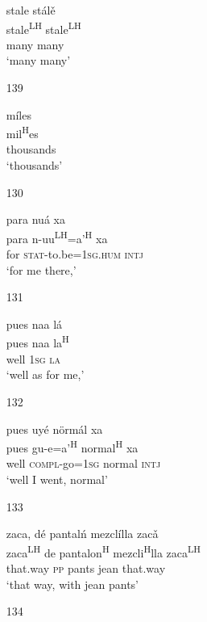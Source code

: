 \begin{itemize}
\glll   stale st\'{a}l\v{e}\\
stale\textsuperscript{LH} stale\textsuperscript{LH}\\
 many many\\
\glt `many many'
 



\item[139]
 
\glll   m\'{i}les\\
mil\textsuperscript{H}es\\
thousands\\
\glt `thousands'
 

\item[130]
 
\glll   para nu\'{a} xa \\
para n-uu\textsuperscript{LH}=a'\textsuperscript{H} xa \\
for \textsc{stat}-to.be=\textsc{1sg.hum} \textsc{intj}\\
\glt `for me there,'
 


\item[131]
 
\glll   pues naa l\'{a} \\
pues naa la\textsuperscript{H}\\
well \textsc{1sg} \textsc{la}\\
\glt `well as for me,'
 


\item[132]
 
\glll   pues uy\'{e} n\"{o}rm\'{a}l xa\\
pues gu-e=a'\textsuperscript{H} normal\textsuperscript{H} xa \\
well \textsc{compl}-go=\textsc{1sg} normal \textsc{intj}\\
\glt `well I went, normal'
 


\item[133]
 
\glll   zaca, d\'{e} pantal\'{n} mezcl\'{i}lla zac\v{a}\\
zaca\textsuperscript{LH} de pantalon\textsuperscript{H} mezcli\textsuperscript{H}lla zaca\textsuperscript{LH}\\
that.way \textsc{pp} pants jean that.way\\
\glt `that way, with jean pants'
 


\item[134]
 

\end{itemize}
